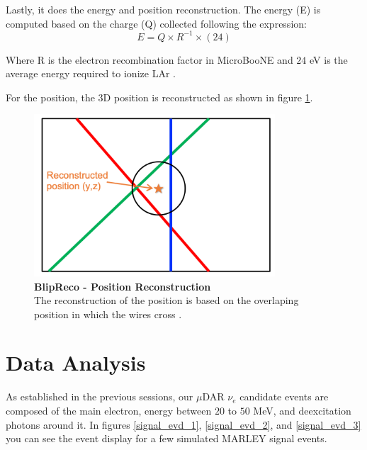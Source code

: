Lastly, it does the energy and position reconstruction. The energy (E) is computed based on the charge (Q) collected following the expression:
\begin{equation}
    E=Q\times R^{-1} \times (24)
\end{equation}

Where R is the electron recombination factor in MicroBooNE and $24$ eV is the average energy required to ionize LAr \cite{lariat_calorimetry_lar}. 

For the position, the 3D position is reconstructed as shown in figure \ref{blip_position}. 

\begin{figure}[h!]
    \centering
    \includegraphics[width=90mm]{Figures/blip_reco_position.png}
    \caption[BlipReco - Position Reconstruction]{{\textbf{BlipReco - Position Reconstruction}}\\ The reconstruction of the position is based on the overlaping position in which the wires cross \cite{will_CM_Aug}.}
    \label{blip_position}
\end{figure}

\section{Data Analysis}
As established in the previous sessions, our $\mu$DAR $\nu_e$ candidate events are composed of the main electron, energy between $20$ to $50$ MeV, and deexcitation photons around it. In figures \ref{signal_evd_1}, \ref{signal_evd_2}, and \ref{signal_evd_3} you can see the event display for a few simulated MARLEY signal events. 

